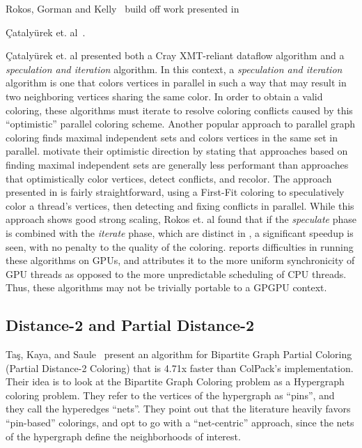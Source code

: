\documentclass{article}
\begin{document}
Rokos, Gorman and Kelly~\cite{rokos2015fast} build off work presented in 
{{\c{C}}ataly{\"u}rek et. al~\cite{ccatalyurek2012graph}.{{\c{C}}ataly{\"u}rek et. al presented
both a Cray XMT-reliant dataflow algorithm and a {\it speculation and iteration} algorithm.
In this context, a {\it speculation and iteration} algorithm is one that colors vertices in parallel
in such a way that may result in two neighboring vertices sharing the same color.
In order to obtain a valid coloring, these algorithms must iterate to resolve coloring conflicts caused 
by this ``optimistic'' parallel coloring scheme. 
Another popular approach to parallel graph coloring finds maximal independent sets and colors vertices
in the same set in parallel. \cite{ccatalyurek2012graph} motivate their optimistic direction by stating that 
approaches based on finding maximal independent sets are generally
less performant than approaches that optimistically color vertices, detect conflicts, and recolor.
The approach presented in \cite{ccatalyurek2012graph} is fairly straightforward, using a First-Fit
coloring to speculatively color a thread's vertices, then detecting and fixing conflicts in parallel.
While this approach shows good strong scaling, Rokos et. al found that if the {\it speculate}
phase is combined with the {\it iterate} phase, which are distinct in \cite{ccatalyurek2012graph}, a 
significant speedup is seen, with no penalty to the quality of the coloring. \cite{rokos2015fast} reports
difficulties in running these algorithms on GPUs, and attributes it to the more uniform synchronicity of
GPU threads as opposed to the more unpredictable scheduling of CPU threads. Thus, these algorithms may
not be trivially portable to a GPGPU context. 

\subsection{Distance-2 and Partial Distance-2}

Ta{\c{s}}, Kaya, and Saule~\cite{tacs2017greed} present an algorithm for Bipartite Graph Partial Coloring
(Partial Distance-2 Coloring) that is 4.71x faster than ColPack's implementation. Their idea is to look at the 
Bipartite Graph Coloring problem as a Hypergraph coloring problem. They refer to the vertices of the hypergraph as
``pins'', and they call the hyperedges ``nets''. They point out that the literature heavily favors ``pin-based'' 
colorings, and opt to go with a ``net-centric'' approach, since the nets of the hypergraph define the neighborhoods
of interest.

}}
\end{document}
